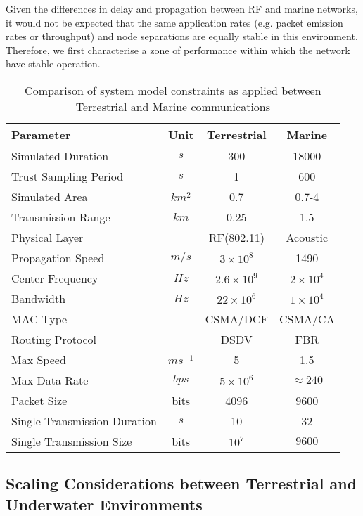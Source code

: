 Given the differences in delay and propagation between RF and marine networks, it would not be expected that the same application rates (e.g. packet emission rates or throughput) and node separations are equally stable in this environment.
Therefore, we first characterise a zone of performance within which the network have stable operation.
%
\begin{table}[h]
	\caption{Comparison of system model constraints as applied between Terrestrial and Marine communications} \label{tab:sysconstraints}
	\begin{center}
		\setlength{\tabcolsep}{8pt}
		\begin{tabular}{lccc}
			\toprule
			Parameter & Unit & Terrestrial & Marine \\
			\midrule
			Simulated Duration & $s$ & 300 & 18000\\
			Trust Sampling Period & $s$ & 1 & 600 \\
			Simulated Area & $km^2$ & 0.7 & 0.7-4 \\
			Transmission Range & $km$ & 0.25 & 1.5 \\
			Physical Layer & & RF(802.11) & Acoustic\\
			Propagation Speed& $m/s$ & $3\times10^8$ & 1490\\
			Center Frequency& $Hz$ & $2.6\times10^9$ & $2 \times 10^4$ \\
			Bandwidth& $Hz$ & $22\times10^6$ & $1\times10^4$\\
			MAC Type & & CSMA/DCF & CSMA/CA\\
			Routing Protocol & & DSDV & FBR \\
			Max Speed & $ms^{-1}$ & 5 & 1.5 \\
			Max Data Rate & $bps$ & $5\times10^6$ & $\approx 240$ \\
			Packet Size & bits & 4096 &  9600 \\
			Single Transmission Duration & $s$ & 10 & 32 \\
			Single Transmission Size & bits & $10^7$ & $9600$ \\
			\bottomrule
		\end{tabular}
		\setlength{\tabcolsep}{6pt}
	\end{center}
\end{table}
%


\subsection{Scaling Considerations between Terrestrial and Underwater Environments}

